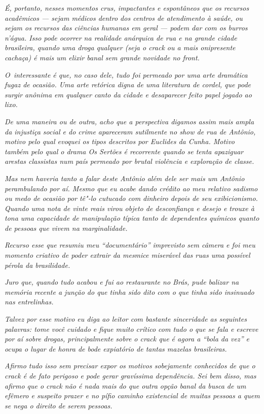 \emph{É, portanto, nesses momentos crus, impactantes e espontâneos que
os recursos acadêmicos --- sejam médicos dentro dos centros de
atendimento à saúde, ou sejam os recursos das ciências humanas em geral
--- podem dar com os burros n'água. Isso pode ocorrer na realidade
anárquica de rua e na grande cidade brasileira, quando uma droga
qualquer (seja o crack ou a mais onipresente cachaça) é mais um elixir
banal sem grande novidade no front.}~

\emph{O~interessante é que, no caso dele, tudo foi permeado por uma arte
dramática fugaz de ocasião. Uma arte retórica digna de uma literatura de
cordel, que pode surgir anônima em qualquer canto da cidade e
desaparecer feito papel jogado ao lixo.}~

\emph{De uma maneira ou de outra, acho que a perspectiva digamos assim
mais ampla da injustiça social e do crime apareceram sutilmente no show
de rua de Antônio, motivo pelo qual evoquei os tipos descritos por
Euclides da Cunha. Motivo também pelo qual o drama Os Sertões é
recorrente quando se tenta apaziguar arestas classistas num país
permeado por brutal violência e exploração de classe.}~

\emph{Mas nem haveria tanto a falar deste Antônio além dele ser mais um
Antônio perambulando por aí. Mesmo que eu acabe dando crédito ao meu
relativo sadismo ou medo de ocasião por tê"-lo cutucado com dinheiro
depois de seu exibicionismo. Quando uma nota de vinte reais virou objeto
de desconfiança e desejo e trouxe à tona uma capacidade de manipulação
típica tanto de dependentes químicos quanto de pessoas que vivem na
marginalidade.}~

\emph{Recurso esse que resumiu meu ``documentário'' imprevisto sem
câmera e foi meu momento criativo de poder extrair da mesmice miserável
das ruas uma possível pérola da brasilidade.}~

\emph{Juro que, quando tudo acabou e fui ao restaurante no Brás, pude
balizar na memória recente a junção do que tinha sido dito com o que
tinha sido insinuado nas entrelinhas.}~

\emph{Talvez por esse motivo eu diga ao leitor com bastante sinceridade
as seguintes palavras: tome você cuidado e fique muito crítico com tudo
o que se fala e escreve por aí sobre drogas, principalmente sobre o
crack que é agora a ``bola da vez'' e ocupa o lugar de honra de bode
expiatório de tantas mazelas brasileiras.}~

\emph{Afirmo tudo isso sem precisar expor os motivos sobejamente
conhecidos de que o crack é de fato perigoso e pode gerar gravíssima
dependência. Sei bem disso, mas afirmo que o crack não é nada mais do
que outra opção banal da busca de um efêmero e suspeito prazer e no
pífio caminho existencial de muitas pessoas a quem se nega o direito de
serem pessoas.}~

